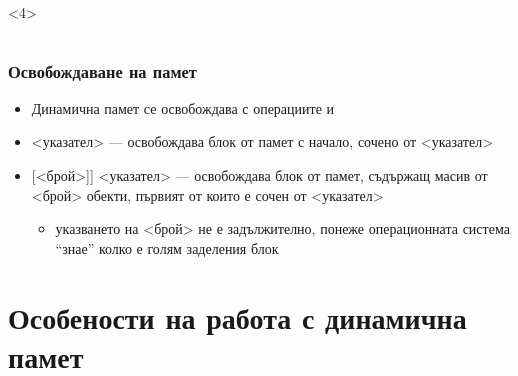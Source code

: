 \documentclass{beamer}
\begin{document}
\begin{frame}[fragile]
\begin{columns}[T,onlytextwidth]
\begin{column}{.5\textwidth}
\begin{overlayarea}{.5\textwidth}{16em}
        \begin{onlyenv}<4>
        \end{onlyenv}
      \end{overlayarea}
  \end{column}
  \end{columns}
\end{frame}

\begin{frame}
  \frametitle{Освобождаване на памет}

  \begin{itemize}[<+->]
  \item Динамична памет се освобождава с операциите  и 
  \item {}<указател> --- освобождава блок от памет с начало, сочено от <указател>
  \item \tta{delete[}[<брой>]\tta] <указател> --- освобождава блок от памет, съдържащ масив от <брой> обекти, първият от които е сочен от <указател>
    \begin{itemize}
    \item указването на <брой> не е задължително, понеже операционната система ``знае'' колко е голям заделения блок
    \end{itemize}
  \end{itemize}
\end{frame}

\section{Особености на работа с динамична памет}
\end{document}
